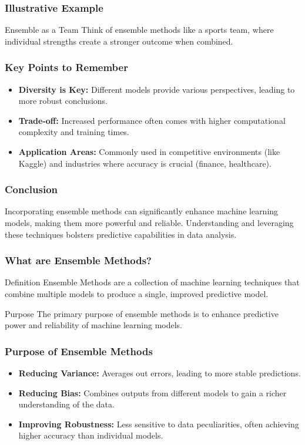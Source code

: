 \documentclass[aspectratio=169]{beamer}
\begin{document}
\begin{frame}[fragile]
    \frametitle{Illustrative Example}
    \begin{block}{Ensemble as a Team}
        Think of ensemble methods like a sports team, where individual strengths create a stronger outcome when combined.
    \end{block}
\end{frame}

\begin{frame}[fragile]
    \frametitle{Key Points to Remember}
    \begin{itemize}
        \item \textbf{Diversity is Key:} Different models provide various perspectives, leading to more robust conclusions.
        \item \textbf{Trade-off:} Increased performance often comes with higher computational complexity and training times.
        \item \textbf{Application Areas:} Commonly used in competitive environments (like Kaggle) and industries where accuracy is crucial (finance, healthcare).
    \end{itemize}
\end{frame}

\begin{frame}[fragile]
    \frametitle{Conclusion}
    Incorporating ensemble methods can significantly enhance machine learning models, making them more powerful and reliable. Understanding and leveraging these techniques bolsters predictive capabilities in data analysis.
\end{frame}

\begin{frame}[fragile]
    \frametitle{What are Ensemble Methods?}
    \begin{block}{Definition}
        Ensemble Methods are a collection of machine learning techniques that combine multiple models to produce a single, improved predictive model. 
    \end{block}
    \begin{block}{Purpose}
        The primary purpose of ensemble methods is to enhance predictive power and reliability of machine learning models.
    \end{block}
\end{frame}

\begin{frame}[fragile]
    \frametitle{Purpose of Ensemble Methods}
    \begin{itemize}
        \item \textbf{Reducing Variance:} Averages out errors, leading to more stable predictions.
        \item \textbf{Reducing Bias:} Combines outputs from different models to gain a richer understanding of the data.
        \item \textbf{Improving Robustness:} Less sensitive to data peculiarities, often achieving higher accuracy than individual models.
    \end{itemize}
\end{frame}
\end{document}
